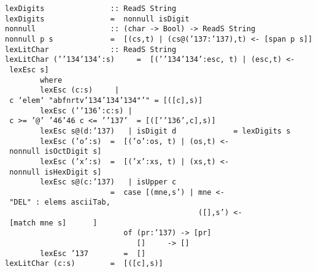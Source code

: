 \eprogB\noindent\bprogB
\mbox{\tt lexDigits\ \ \ \ \ \ \ \ \ \ \ \ \ \ \ ::\ ReadS\ String\ }\\
\mbox{\tt lexDigits\ \ \ \ \ \ \ \ \ \ \ \ \ \ \ =\ \ nonnull\ isDigit}
%
\eprogB\noindent\bprogB
\mbox{\tt nonnull\ \ \ \ \ \ \ \ \ \ \ \ \ \ \ \ \ ::\ (char\ ->\ Bool)\ ->\ ReadS\ String}\\
\mbox{\tt nonnull\ p\ s\ \ \ \ \ \ \ \ \ \ \ \ \ =\ \ [(cs,t)\ |\ (cs@({\char'137}:{\char'137}),t)\ <-\ [span\ p\ s]]}
%
\eprogB\noindent\bprogB
\mbox{\tt lexLitChar\ \ \ \ \ \ \ \ \ \ \ \ \ \ ::\ ReadS\ String}\\
\mbox{\tt lexLitChar\ ('{\char'134}{\char'134}':s)\ \ \ \ \ =\ \ [('{\char'134}{\char'134}':esc,\ t)\ |\ (esc,t)\ <-\ lexEsc\ s]}\\
\mbox{\tt \ \ \ \ \ \ \ \ where}\\
\mbox{\tt \ \ \ \ \ \ \ \ lexEsc\ (c:s)\ \ \ \ \ |\ c\ `elem`\ "abfnrtv{\char'134}{\char'134}{\char'134}"'"\ =\ [([c],s)]}\\
\mbox{\tt \ \ \ \ \ \ \ \ lexEsc\ ('{\char'136}':c:s)\ |\ c\ >=\ '@'\ {\char'46}{\char'46}\ c\ <=\ '{\char'137}'\ \ =\ [(['{\char'136}',c],s)]}\\
\mbox{\tt \ \ \ \ \ \ \ \ lexEsc\ s@(d:{\char'137})\ \ \ |\ isDigit\ d\ \ \ \ \ \ \ \ \ \ \ \ \ =\ lexDigits\ s}\\
\mbox{\tt \ \ \ \ \ \ \ \ lexEsc\ ('o':s)\ \ =\ \ [('o':os,\ t)\ |\ (os,t)\ <-\ nonnull\ isOctDigit\ s]}\\
\mbox{\tt \ \ \ \ \ \ \ \ lexEsc\ ('x':s)\ \ =\ \ [('x':xs,\ t)\ |\ (xs,t)\ <-\ nonnull\ isHexDigit\ s]}\\
\mbox{\tt \ \ \ \ \ \ \ \ lexEsc\ s@(c:{\char'137})\ \ \ |\ isUpper\ c}\\
\mbox{\tt \ \ \ \ \ \ \ \ \ \ \ \ \ \ \ \ \ \ \ \ \ \ \ \ =\ \ case\ [(mne,s')\ |\ mne\ <-\ "DEL"\ :\ elems\ asciiTab,}\\
\mbox{\tt \ \ \ \ \ \ \ \ \ \ \ \ \ \ \ \ \ \ \ \ \ \ \ \ \ \ \ \ \ \ \ \ \ \ \ \ \ \ \ \ \ \ \ \ ([],s')\ <-\ [match\ mne\ s]\ \ \ \ \ \ ]}\\
\mbox{\tt \ \ \ \ \ \ \ \ \ \ \ \ \ \ \ \ \ \ \ \ \ \ \ \ \ \ \ of\ (pr:{\char'137})\ ->\ [pr]}\\
\mbox{\tt \ \ \ \ \ \ \ \ \ \ \ \ \ \ \ \ \ \ \ \ \ \ \ \ \ \ \ \ \ \ []\ \ \ \ \ ->\ []}\\
\mbox{\tt \ \ \ \ \ \ \ \ lexEsc\ {\char'137}\ \ \ \ \ \ \ \ =\ \ []}\\
\mbox{\tt lexLitChar\ (c:s)\ \ \ \ \ \ \ \ =\ \ [([c],s)]}
